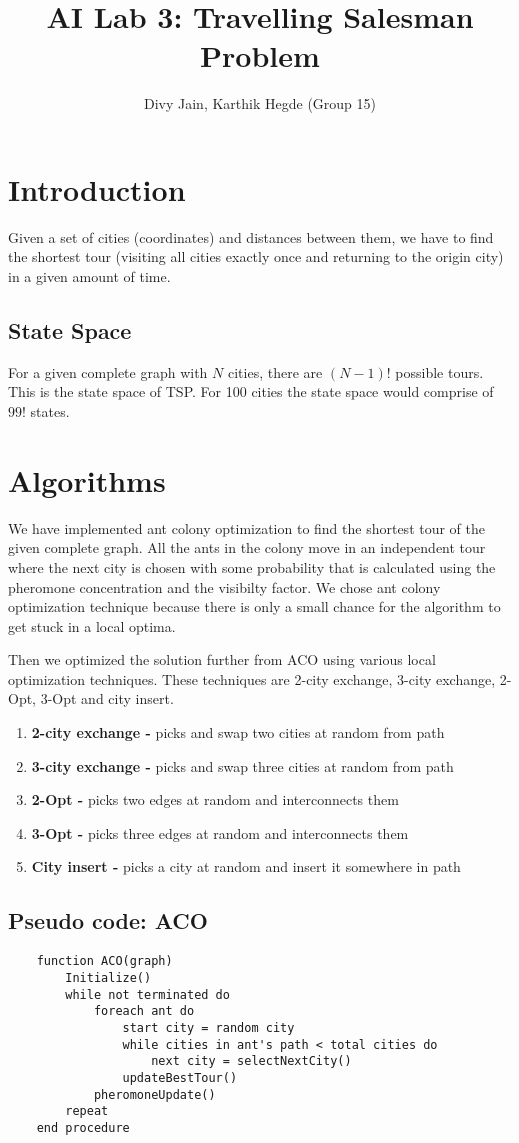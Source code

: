 \documentclass[11pt,a4paper]{article}
\title{AI Lab 3: Travelling Salesman Problem}
\author{Divy Jain, Karthik Hegde (Group 15)}
\begin{document}
\maketitle
\thispagestyle{empty}
\section{Introduction}
Given a set of cities (coordinates) and distances between them, 
we have to find the shortest tour (visiting all
cities exactly once and returning to the origin city) in a given amount of time.

\subsection{State Space}
For a given complete graph with $N$ cities, there are $(N-1)! $ possible tours. This is
the state space of TSP. For 100 cities the state space would comprise of $99! $ states.

\section{Algorithms}
We have implemented ant colony optimization to find the 
shortest tour of the given complete graph.
All the ants in the colony move in an independent tour where the next city  is chosen with some probability that is calculated using the pheromone
concentration and the visibilty factor.
We chose ant colony optimization technique because there is only a small chance for the algorithm to get stuck in a local optima.

Then we optimized the solution further from ACO using various local optimization techniques. These techniques are 2-city exchange, 3-city exchange, 2-Opt, 3-Opt and city insert.
\begin{enumerate}
    \item \textbf{2-city exchange -} picks and swap two cities at random from path 
    \item \textbf{3-city exchange -} picks and swap three cities at random from path
    \item \textbf{2-Opt -} picks two edges at random and interconnects them
    \item \textbf{3-Opt -} picks three edges at random and interconnects them  
    \item \textbf{City insert -} picks a city at random and insert it somewhere in path
\end{enumerate}
\subsection{Pseudo code: ACO}
\begin{verbatim}
    function ACO(graph)
        Initialize()
        while not terminated do
            foreach ant do
                start city = random city
                while cities in ant's path < total cities do
                    next city = selectNextCity()
                updateBestTour()
            pheromoneUpdate()
        repeat
    end procedure
\end{verbatim}
\end{document}
